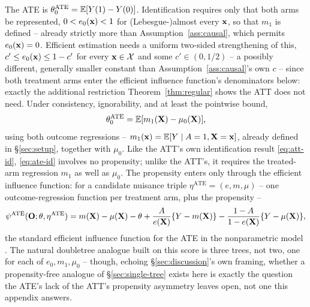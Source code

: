 \documentclass[12pt]{article}
\begin{document}
The ATE is $\theta_0^{\mathrm{ATE}}=\mathbb{E}[Y(1)-Y(0)]$. Identification requires only that both arms be
represented, $0<e_0(\mathbf{x})<1$ for (Lebesgue-)almost every $\mathbf{x}$, so that $m_1$ is defined --
already strictly more than Assumption~\ref{ass:causal}, which permits $e_0(\mathbf{x})=0$. Efficient
estimation needs a uniform two-sided strengthening of this, $c'\le e_0(\mathbf{x})\le1-c'$ for every
$\mathbf{x}\in\mathcal{X}$ and some $c'\in(0,1/2)$ -- a possibly different, generally smaller constant than
Assumption~\ref{ass:causal}'s own $c$ -- since both treatment arms enter the efficient influence
function's denominators below: exactly the additional restriction Theorem~\ref{thm:regular} shows
the ATT does not need. Under consistency, ignorability, and at least the pointwise bound,
\begin{equation}
\label{eq:ate-id}
  \theta_0^{\mathrm{ATE}} = \mathbb{E}[m_1(\mathbf{X})-\mu_0(\mathbf{X})],
\end{equation}
using both outcome regressions -- $m_1(\mathbf{x})=\mathbb{E}[Y\mid A=1,\mathbf{X}=\mathbf{x}]$, already defined in
\S\ref{sec:setup}, together with $\mu_0$. Like the ATT's own identification result
\eqref{eq:att-id}, \eqref{eq:ate-id} involves no propensity; unlike the ATT's, it requires the
treated-arm regression $m_1$ as well as $\mu_0$. The propensity enters only through the efficient
influence function: for a candidate nuisance triple $\eta^{\mathrm{ATE}}=(e,m,\mu)$ -- one
outcome-regression function per treatment arm, plus the propensity --
\begin{equation}
\label{eq:score-ate}
  \psi^{\mathrm{ATE}}(\mathbf{O};\theta,\eta^{\mathrm{ATE}})
  =
  m(\mathbf{X})-\mu(\mathbf{X})-\theta
  +
  \frac{A}{e(\mathbf{X})}\{Y-m(\mathbf{X})\}
  -
  \frac{1-A}{1-e(\mathbf{X})}\{Y-\mu(\mathbf{X})\},
\end{equation}
the standard efficient influence function for the ATE in the nonparametric model
\citep{hahn1998}. The natural doubletree analogue built on this score is three trees, not two,
one for each of $e_0,m_1,\mu_0$ -- though, echoing \S\ref{sec:discussion}'s own framing, whether a
propensity-free analogue of \S\ref{sec:single-tree} exists here is exactly the question the ATE's
lack of the ATT's propensity asymmetry leaves open, not one this appendix answers.
\end{document}
